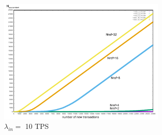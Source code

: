 \documentclass[a4paper,10pt,twocolumn]{article}
\begin{document}
\begin{appendices}
	 \begin{figure}[H]
		\begin{center}
			\includegraphics[width=80mm]{10sec_ref.png}
			\caption{ \( \lambda_{in}=\) 10 TPS}
		  \label{fig:sec10_ref}
		\end{center}
	 \end{figure}
	\end{appendices}
	 
	  
	
\end{document}
